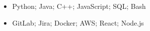 \documentclass{article}[10pt]
\begin{document}
\section*{\underline{}}

\begin{itemize}
	\item Python; Java; C++; JavaScript; SQL; Bash
	\item GitLab; Jira; Docker; AWS; React; Node.js
\end{itemize}
\end{document}
